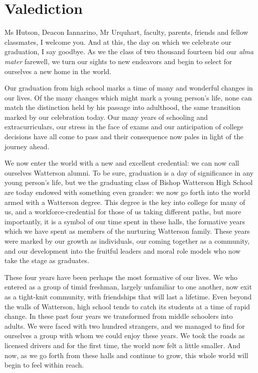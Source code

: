 \documentclass{report}
\begin{document}
\section*{Valediction}

Ms Hutson, Deacon Iannarino, Mr Urquhart, faculty, parents, friends and fellow
classmates, I welcome you. And at this, the day on which we celebrate our
graduation, I say goodbye. As we the class of two thousand fourteen bid our
\emph{alma mater} farewell, we turn our sights to new endeavors and begin to
select for ourselves a new home in the world.

Our graduation from high school marks a time of many and wonderful changes in
our lives. Of the many changes which might mark a young person's life, none can
match the distinction held by his passage into adulthood, the same transition
marked by our celebration today. Our many years of schooling and
extracurriculars, our stress in the face of exams and our anticipation of
college decisions have all come to pass and their consequence now pales in light
of the journey ahead. 

We now enter the world with a new and excellent credential: we can now call
ourselves Watterson alumni. To be sure, graduation is a day of significance in
any young person's life, but we the graduating class of Bishop Watterson High
School are today endowed with something even grander: we now go forth into the
world armed with a Watterson degree. This degree is the key into college for
many of us, and a workforce-credential for those of us taking different paths,
but more importantly, it is a symbol of our time spent in these halls, the
formative years which we have spent as members of the nurturing Watterson
family. These years were marked by our growth as individuals, our coming
together as a community, and our development into the fruitful leaders and
moral role models who now take the stage as graduates.

These four years have been perhaps the most formative of our lives. We who
entered as a group of timid freshman, largely unfamiliar to one another, now
exit as a tight-knit community, with friendships that will last a lifetime.
Even beyond the walls of Watterson, high school tends to catch its students at
a time of rapid change. In these past four years we transformed from middle
schoolers into adults. We were faced with two hundred strangers, and we managed
to find for ourselves a group with whom we could enjoy these years. We took the
roads as licensed drivers and for the first time, the world now felt a little
smaller. And now, as we go forth from these halls and continue to grow, this
whole world will begin to feel within reach.
\end{document}
